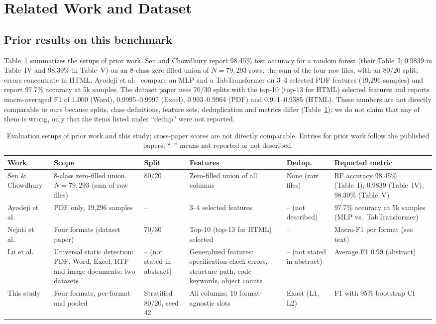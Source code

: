 \documentclass[conference]{IEEEtran}
\begin{document}
\section{Related Work and Dataset}
\subsection{Prior results on this benchmark}
Table~\ref{tab:prior} summarizes the setups of prior work. Sen and Chowdhury \cite{sen2026} report 98.45\% test accuracy for a random forest (their Table~I; 0.9839 in Table~IV and 98.39\% in Table~V) on an 8-class zero-filled union of $N=79{,}293$ rows, the sum of the four raw files, with an 80/20 split; errors concentrate in HTML. Ayodeji et al.\ \cite{ayodeji2026} compare an MLP and a TabTransformer on 3--4 selected PDF features (19,296 samples) and report 97.7\% accuracy at 5k samples. The dataset paper \cite{nejati2026} uses 70/30 splits with the top-10 (top-13 for HTML) selected features and reports macro-averaged F1 of 1.000 (Word), 0.9995--0.9997 (Excel), 0.993--0.9964 (PDF) and 0.911--0.9385 (HTML). These numbers are not directly comparable to ours because splits, class definitions, feature sets, deduplication and metrics differ (Table~\ref{tab:prior}); we do not claim that any of them is wrong, only that the items listed under ``dedup'' were not reported.

\begin{table}[t]
\centering\footnotesize
\caption{Evaluation setups of prior work and this study; cross-paper scores are not directly comparable. Entries for prior work follow the published papers; ``--'' means not reported or not described.}
\label{tab:prior}
\begin{tabular}{p{2.6cm}p{2.6cm}p{1.7cm}p{3.0cm}p{1.6cm}p{3.6cm}}
\toprule
Work & Scope & Split & Features & Dedup. & Reported metric \\
\midrule
Sen \& Chowdhury \cite{sen2026} & 8-class zero-filled union, $N=79{,}293$ (sum of raw files) & 80/20 & Zero-filled union of all columns & None (raw files) & RF accuracy 98.45\% (Table~I), 0.9839 (Table~IV), 98.39\% (Table~V) \\
Ayodeji et al.\ \cite{ayodeji2026} & PDF only, 19,296 samples & -- & 3--4 selected features & -- (not described) & 97.7\% accuracy at 5k samples (MLP vs.\ TabTransformer) \\
Nejati et al.\ \cite{nejati2026} & Four formats (dataset paper) & 70/30 & Top-10 (top-13 for HTML) selected & -- & Macro-F1 per format (see text) \\
Lu et al.\ \cite{lu2021} & Universal static detection: PDF, Word, Excel, RTF and image documents; two datasets & -- (not stated in abstract) & Generalized features: specification-check errors, structure path, code keywords, object counts & -- (not stated in abstract) & Average F1 0.99 (abstract) \\
This study & Four formats, per-format and pooled & Stratified 80/20, seed 42 & All columns; 10 format-agnostic slots & Exact (L1, L2) & F1 with 95\% bootstrap CI \\
\bottomrule
\end{tabular}
\end{table}
\end{document}
